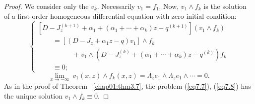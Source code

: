 \documentclass{surv-l}
\theoremstyle{plain}
\theoremstyle{definition}
\numberwithin{equation}{chapter}
\begin{document}
\begin{proof}
We consider only the $v_{k}$. Necessarily $v_{1}=f_{1}$. Now, $v_{1}\wedge f_{k}$ is the solution of a first order homogeneous differential equation with zero initial condition:
\setcounter{equation}{6}
\begin{equation}\label{eq7.7}
\left\{\begin{array}{l}
[D-J_{z}^{(k+1)}+\alpha_{1}+ (\alpha_{1}+\cdots+\alpha_{k})z-q^{(k+1)}](v_{1}\wedge f_{k})\\
\qquad\,=[(D-J_{z}+\alpha_{1}z-q)v_{1}]\wedge f_{k}\\
\qquad\qquad\quad+v_{1}\wedge (D-J_{z}^{(k)}+ (\alpha_{1}+\cdots+\alpha_{k})z-q^{(k)})f_{k}\\
\qquad\,\equiv 0;
\end{array}\right.
\end{equation}
\begin{equation}\label{eq7.8}
\lim_{x\rightarrow-\infty}\  v_{1}(x, z)\wedge f_{k}(x, z)=\Lambda_{z}e_{1}\wedge\Lambda_{z}e_{1}\wedge\cdots =0.
\end{equation}
As in the proof of Theorem ~\ref{chap01:thm3.7}, the problem (\ref{eq7.7}), (\ref{eq7.8}) has the unique solution $v_{1}\wedge f_{k}\equiv 0$.


\end{proof}
\end{document}
